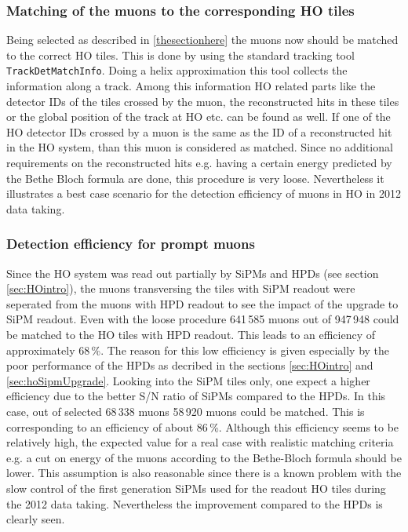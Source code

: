 		\subsubsection{Matching of the muons to the corresponding HO tiles}
			Being selected as described in \ref{thesectionhere} the muons now should be matched to the correct HO tiles.
			This is done by using the standard tracking tool \verb+TrackDetMatchInfo+.
			Doing a helix approximation this tool collects the information along a track.
			Among this information HO related parts like the detector IDs of the tiles crossed by the muon, the reconstructed hits in these tiles or the global position of the track at HO etc. can be
			found as well.
			If one of the HO detector IDs crossed by a muon is the same as the ID of a reconstructed hit in the HO system, than this muon is considered as matched.
			Since no additional requirements on the reconstructed hits e.g. having a certain energy predicted by the Bethe Bloch formula are done, this procedure is very loose.
			Nevertheless it illustrates a best case scenario for the detection efficiency of muons in HO in 2012 data taking.
		\subsubsection{Detection efficiency for prompt muons}
			Since the HO system was read out partially by SiPMs and HPDs (see section \ref{sec:HOintro}), the muons transversing the tiles with SiPM readout were seperated from the muons with HPD readout to
			see the impact of the upgrade to SiPM readout.
			Even with the loose procedure 641\,585 muons out of 947\,948 could be matched to the HO tiles with HPD readout.
			This leads to an efficiency of approximately 68\,\%.
			The reason for this low efficiency is given especially by the poor performance of the HPDs as decribed in the sections \ref{sec:HOintro} and \ref{sec:hoSipmUpgrade}.
			Looking into the SiPM tiles only, one expect a higher efficiency due to the better S/N ratio of SiPMs compared to the HPDs.
			In this case, out of selected 68\,338 muons 58\,920 muons could be matched.
			This is corresponding to an efficiency of about 86\,\%.
			Although this efficiency seems to be relatively high, the expected value for a real case with realistic matching criteria e.g. a cut on energy of the muons according to the Bethe-Bloch formula
			should be lower.
			This assumption is also reasonable since there is a known problem with the slow control of the first generation SiPMs used for the readout HO tiles during the 2012 data taking.
			Nevertheless the improvement compared to the HPDs is clearly seen.
